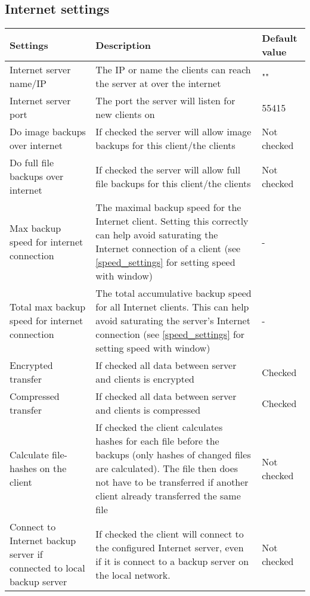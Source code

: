\documentclass[a4paper,10pt]{article}
\begin{document}
\subsection{Internet settings}
\label{internet_settings}

\begin{tabular}{|p{}|p{}|p{}|}
\hline
Settings  & Description & Default value\\
\hline\hline
Internet server name/IP & The IP or name the clients can reach the server at over the internet & ""\\
\hline
Internet server port & The port the server will listen for new clients on & 55415 \\
\hline
Do image backups over internet & If checked the server will allow image backups for this client/the clients & Not checked \\
\hline
Do full file backups over internet & If checked the server will allow full file backups for this client/the clients & Not checked \\
\hline
Max backup speed for internet connection & The maximal backup speed for the Internet client. Setting this correctly can help avoid saturating the Internet connection of a client (see \ref{speed_settings} for setting speed with window) & - \\
\hline
Total max backup speed for internet connection & The total accumulative backup speed for all Internet clients. This can help avoid saturating the server's Internet connection (see \ref{speed_settings} for setting speed with window) & - \\
\hline
Encrypted transfer & If checked all data between server and clients is encrypted & Checked \\
\hline
Compressed transfer & If checked all data between server and clients is compressed & Checked \\
\hline
Calculate file-hashes on the client & If checked the client calculates hashes for each file before the backups (only hashes of changed files are calculated).
The file then does not have to be transferred if another client already transferred the same file & Not checked \\
\hline
Connect to Internet backup server if connected to local backup server & If checked the client will connect to the configured Internet server, even if it is connect to a backup server on the local network. & Not checked \\
\hline
\end{tabular}
\end{document}
